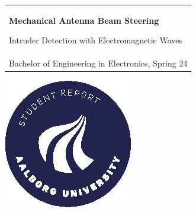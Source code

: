 %
\begin{titlepage}
\vspace*{\fill}
  \noindent%
  {\color{white}\colorbox{aaublue}{\begin{tabular}{@{}p{\textwidth}@{}}
    \begin{center}
    \Huge{\textbf{
      Mechanical Antenna Beam Steering%
    }}
    \end{center}
    \begin{center}
      \Large{
        Intruder Detection with Electromagnetic Waves%
      }
    \end{center}
    \vspace{0.2cm}
   \begin{center}
    {\Large
      Rikke Udengaard%
    }\\
    \vspace{0.2cm}
    {\large
      Bachelor of Engineering in Electronics, Spring 24%
    }
   \end{center}
   \vspace{0.2cm}
   \begin{center}
    {\Large
      Fifth Semester Project
    }
   \end{center}
  \end{tabular}}}
  \vfill
  \begin{center}
    \includegraphics[width=0.2\paperwidth]{images/aau_logo_circle_en.eps}%
  \end{center}
\end{titlepage}
\clearpage
{}